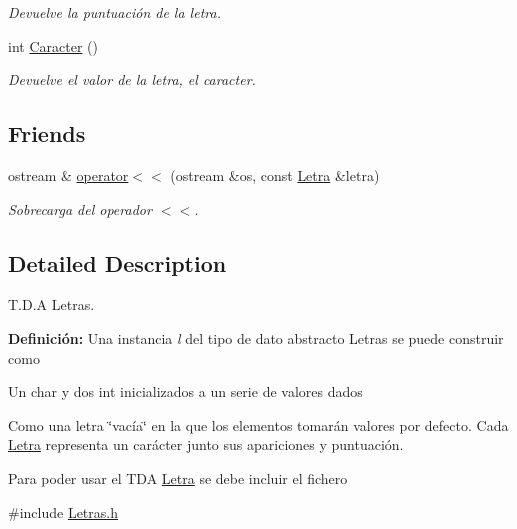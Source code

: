 \begin{DoxyCompactItemize}
\begin{DoxyCompactList}\small\item\em Devuelve la puntuación de la letra. \end{DoxyCompactList}\item 
\hypertarget{classLetra_ae6b5f325b309024886f79c674f8b1d1f}{int \hyperlink{classLetra_ae6b5f325b309024886f79c674f8b1d1f}{Caracter} ()}\label{classLetra_ae6b5f325b309024886f79c674f8b1d1f}

\begin{DoxyCompactList}\small\item\em Devuelve el valor de la letra, el caracter. \end{DoxyCompactList}\end{DoxyCompactItemize}
\subsection*{Friends}
\begin{DoxyCompactItemize}
\item 
ostream \& \hyperlink{classLetra_a0c21baaffc309d806b8efa66c39aeabd}{operator$<$$<$} (ostream \&os, const \hyperlink{classLetra}{Letra} \&letra)
\begin{DoxyCompactList}\small\item\em Sobrecarga del operador $<$$<$. \end{DoxyCompactList}\end{DoxyCompactItemize}


\subsection{Detailed Description}
T.\-D.\-A Letras. 

{\bfseries Definición\-:} Una instancia {\itshape l} del tipo de dato abstracto Letras se puede construir como
\begin{DoxyItemize}
\item Un char y dos int inicializados a un serie de valores dados
\item Como una letra \char`\"{}vacía\char`\"{} en la que los elementos tomarán valores por defecto. Cada \hyperlink{classLetra}{Letra} representa un carácter junto sus apariciones y puntuación.
\end{DoxyItemize}

Para poder usar el T\-D\-A \hyperlink{classLetra}{Letra} se debe incluir el fichero

{\ttfamily \#include \hyperlink{Letras_8h}{Letras.\-h}} 

